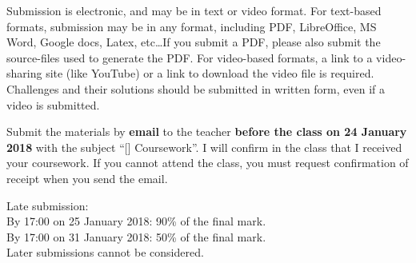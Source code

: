 Submission is electronic, and may be in text or video format. For text-based formats, submission may be in any format, including PDF, LibreOffice, MS Word, Google docs, Latex, etc\ldots If you submit a PDF, please also submit the source-files used to generate the PDF. For video-based formats, a link to a video-sharing site (like YouTube) or a link to download the video file is required. Challenges and their solutions should be submitted in written form, even if a video is submitted.

Submit the materials by \textbf{email} to the teacher \textbf{before the class on 24 January 2018} with the subject ``[\coursenospace] Coursework''. I will confirm in the class that I received your coursework. If you cannot attend the class, you must request confirmation of receipt when you send the email.

Late submission:\\
By 17:00 on 25 January 2018: 90\% of the final mark.\\
By 17:00 on 31 January 2018: 50\% of the final mark.\\
Later submissions cannot be considered.
